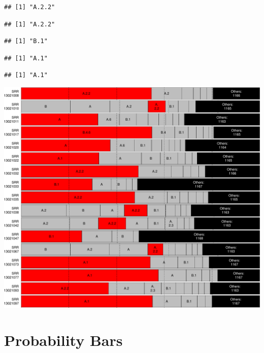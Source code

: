 \documentclass[
]{article}
\begin{document}
\begin{verbatim}
## [1] "A.2.2"
\end{verbatim}

\begin{verbatim}
## [1] "A.2.2"
\end{verbatim}

\begin{verbatim}
## [1] "B.1"
\end{verbatim}

\begin{verbatim}
## [1] "A.1"
\end{verbatim}

\begin{verbatim}
## [1] "A.1"
\end{verbatim}

\includegraphics{pangolin_results_report_d_files/figure-latex/pareto-3.pdf}

\hypertarget{probability-bars}{%
\section{Probability Bars}\label{probability-bars}}
\end{document}
